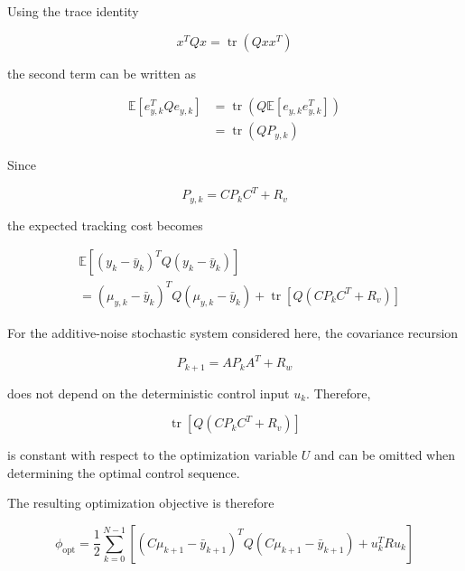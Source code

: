 Using the trace identity

\begin{equation}
    x^TQx
    =
    \operatorname{tr}
    \left(
        Qxx^T
    \right)
\end{equation}

the second term can be written as

\begin{align}
    \mathbb{E}
    \left[
        e_{y,k}^TQe_{y,k}
    \right]
    &=
    \operatorname{tr}
    \left(
        Q
        \mathbb{E}
        [e_{y,k}e_{y,k}^T]
    \right) \\
    &=
    \operatorname{tr}
    \left(
        QP_{y,k}
    \right)
\end{align}

Since

\begin{equation}
    P_{y,k}
    =
    CP_kC^T+R_v
\end{equation}

the expected tracking cost becomes

\begin{align}
    &\mathbb{E}
    \left[
        (y_k-\bar{y}_k)^T
        Q
        (y_k-\bar{y}_k)
    \right]
    \nonumber\\
    &=
    (\mu_{y,k}-\bar{y}_k)^T
    Q
    (\mu_{y,k}-\bar{y}_k)
    +
    \operatorname{tr}
    \left[
        Q(CP_kC^T+R_v)
    \right]
\end{align}

For the additive-noise stochastic system considered here, the covariance recursion

\begin{equation}
    P_{k+1}
    =
    AP_kA^T+R_w
\end{equation}

does not depend on the deterministic control input \(u_k\). Therefore,

\begin{equation}
    \operatorname{tr}
    \left[
        Q(CP_kC^T+R_v)
    \right]
\end{equation}

is constant with respect to the optimization variable \(U\) and can be omitted when determining the optimal control sequence.

The resulting optimization objective is therefore

\begin{equation}
    \phi_{\mathrm{opt}}
    =
    \frac{1}{2}
    \sum_{k=0}^{N-1}
    \left[
        (C\mu_{k+1}-\bar{y}_{k+1})^T
        Q
        (C\mu_{k+1}-\bar{y}_{k+1})
        +
        u_k^TRu_k
    \right]
\end{equation}

